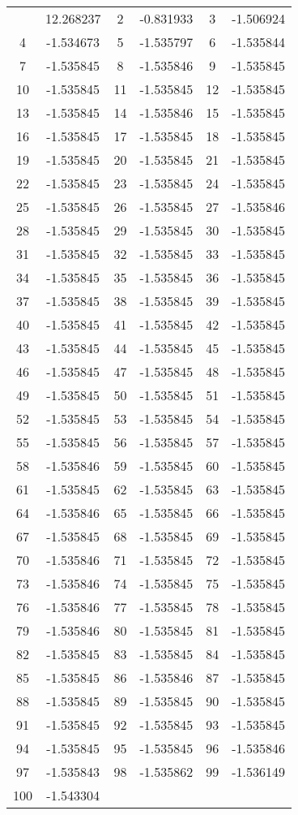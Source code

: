 \documentclass[12pt]{article}
\begin{document}
\begin{longtable}{@{}cc|cc|cc@{}}
\bottomrule
\endlastfoot
1 & 12.268237 & 2 & -0.831933 & 3 & -1.506924 \\
4 & -1.534673 & 5 & -1.535797 & 6 & -1.535844 \\
7 & -1.535845 & 8 & -1.535846 & 9 & -1.535845 \\
10 & -1.535845 & 11 & -1.535845 & 12 & -1.535845 \\
13 & -1.535845 & 14 & -1.535846 & 15 & -1.535845 \\
16 & -1.535845 & 17 & -1.535845 & 18 & -1.535845 \\
19 & -1.535845 & 20 & -1.535845 & 21 & -1.535845 \\
22 & -1.535845 & 23 & -1.535845 & 24 & -1.535845 \\
25 & -1.535845 & 26 & -1.535845 & 27 & -1.535846 \\
28 & -1.535845 & 29 & -1.535845 & 30 & -1.535845 \\
31 & -1.535845 & 32 & -1.535845 & 33 & -1.535845 \\
34 & -1.535845 & 35 & -1.535845 & 36 & -1.535845 \\
37 & -1.535845 & 38 & -1.535845 & 39 & -1.535845 \\
40 & -1.535845 & 41 & -1.535845 & 42 & -1.535845 \\
43 & -1.535845 & 44 & -1.535845 & 45 & -1.535845 \\
46 & -1.535845 & 47 & -1.535845 & 48 & -1.535845 \\
49 & -1.535845 & 50 & -1.535845 & 51 & -1.535845 \\
52 & -1.535845 & 53 & -1.535845 & 54 & -1.535845 \\
55 & -1.535845 & 56 & -1.535845 & 57 & -1.535845 \\
58 & -1.535846 & 59 & -1.535845 & 60 & -1.535845 \\
61 & -1.535845 & 62 & -1.535845 & 63 & -1.535845 \\
64 & -1.535846 & 65 & -1.535845 & 66 & -1.535845 \\
67 & -1.535845 & 68 & -1.535845 & 69 & -1.535845 \\
70 & -1.535846 & 71 & -1.535845 & 72 & -1.535845 \\
73 & -1.535846 & 74 & -1.535845 & 75 & -1.535845 \\
76 & -1.535846 & 77 & -1.535845 & 78 & -1.535845 \\
79 & -1.535846 & 80 & -1.535845 & 81 & -1.535845 \\
82 & -1.535845 & 83 & -1.535845 & 84 & -1.535845 \\
85 & -1.535845 & 86 & -1.535846 & 87 & -1.535845 \\
88 & -1.535845 & 89 & -1.535845 & 90 & -1.535845 \\
91 & -1.535845 & 92 & -1.535845 & 93 & -1.535845 \\
94 & -1.535845 & 95 & -1.535845 & 96 & -1.535846 \\
97 & -1.535843 & 98 & -1.535862 & 99 & -1.536149 \\
100 & -1.543304 &  &  &  &  \\

\end{longtable}
\end{document}
